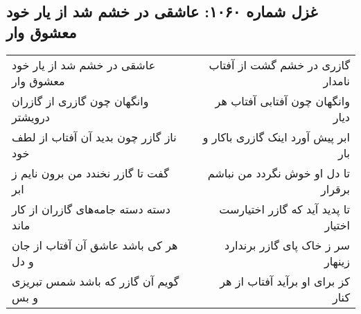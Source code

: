 \begin{center}
\section*{غزل شماره ۱۰۶۰: عاشقی در خشم شد از یار خود معشوق وار}
\label{sec:1060}
\begin{longtable}{l p{0.5cm} r}
عاشقی در خشم شد از یار خود معشوق وار
&&
گازری در خشم گشت از آفتاب نامدار
\\
وانگهان چون گازری از گازران درویشتر
&&
وانگهان چون آفتابی آفتاب هر دیار
\\
ناز گازر چون بدید آن آفتاب از لطف خود
&&
ابر پیش آورد اینک گازری باکار و بار
\\
گفت تا گازر نخندد من برون نایم ز ابر
&&
تا دل او خوش نگردد من نباشم برقرار
\\
دسته دسته جامه‌های گازران از کار ماند
&&
تا پدید آید که گازر اختیارست اختیار
\\
هر کی باشد عاشق آن آفتاب از جان و دل
&&
سر ز خاک پای گازر برندارد زینهار
\\
گویم آن گازر که باشد شمس تبریزی و بس
&&
کز برای او برآید آفتاب از هر کنار
\\
\end{longtable}
\end{center}
